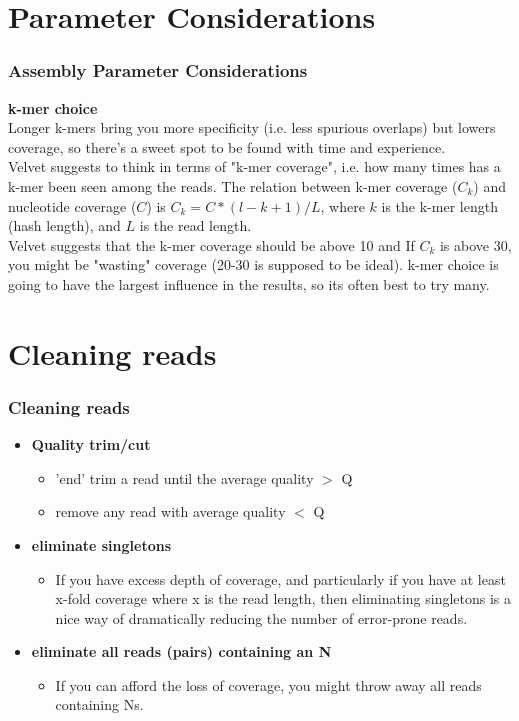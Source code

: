 \documentclass[pdf]{beamer}
\begin{document}
\section{Parameter Considerations}
\begin{frame}
\frametitle{Assembly Parameter Considerations}
\textbf{k-mer choice}\\
Longer k-mers bring you more specificity (i.e. less spurious overlaps) but lowers coverage, so there's a sweet spot to be found with time and experience.\\
\vspace{.1in}
Velvet suggests to think in terms of "k-mer coverage", i.e. how many times has  a k-mer been seen among the reads. The relation between k-mer coverage ($C_k$) and nucleotide coverage ($C$) is $C_k = C*(l-k+1)/L$, where $k$ is the k-mer length (hash length), and $L$ is the read length. \\
\vspace{.1in}
Velvet suggests that the k-mer coverage should be above 10 and If $C_k$ is above 30, you might be "wasting" coverage (20-30 is supposed to be ideal). k-mer choice is going to have the largest influence in the results, so its often best to try many.
\end{frame}

\section{Cleaning reads}
\begin{frame}
\frametitle{Cleaning reads}
\begin{itemize}
\item \textbf{Quality trim/cut}
\begin{itemize} 
\item 'end' trim a read until the average quality $>$ Q
\item remove any read with average quality $<$ Q
\end{itemize}
\item \textbf{eliminate singletons}
\begin{itemize}
\item If you have excess depth of coverage, and particularly if you have at least x-fold coverage where x is the read length, then eliminating singletons is a nice way of dramatically reducing the number of error-prone reads.
\end{itemize}
\item \textbf{eliminate all reads (pairs) containing an N}
\begin{itemize}
\item If you can afford the loss of coverage, you might throw away all reads containing Ns.
\end{itemize}
\end{itemize}
\end{frame}
\end{document}
